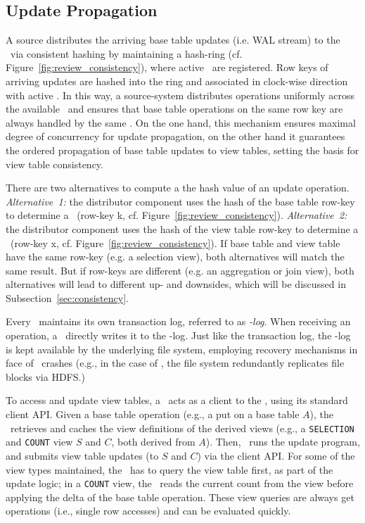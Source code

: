 \subsection{Update Propagation} 
\label{subsec:update_processing} 

A source distributes the arriving base table updates (i.e. WAL stream) 
to the \VMs\ via consistent hashing by maintaining a hash-ring
(cf. Figure~\ref{fig:review_consistency}), where active \VMs\ are
registered.  Row keys of arriving updates are hashed into the ring and
associated in clock-wise direction with active \VMs.  In this way, a
source-system distributes operations uniformly across the available
\VMs\ and ensures that base table operations on the same row key are
always handled by the same \VM. On the one hand, this mechanism
ensures maximal degree of concurrency for update propagation, on the other
hand it guarantees the ordered propagation of base table
updates to view tables, setting the basis for view table consistency.

There are two alternatives to compute a the hash value of an update 
operation. \textit{Alternative~1:} the distributor component uses the 
hash of the base table row-key to determine a \VM\ (row-key k, cf. 
Figure~\ref{fig:review_consistency}). \textit{Alternative~2:} the 
distributor component uses the hash of the view table row-key to 
determine a \VM\ (row-key x, cf. Figure~\ref{fig:review_consistency}). 
If base table and view table have the same row-key (e.g. a selection 
view), both alternatives will match the same result. But if row-keys are 
different (e.g. an aggregation or join view), both alternatives will 
lead to different up- and downsides, which will be discussed in 
Subsection~\ref{sec:consistency}. 


Every \VM\ maintains its own transaction log, referred to as
\textit{\VM-log}. When receiving an operation, a \VM\ directly writes
it to the \VM-log. Just like the transaction log, the \VM-log is kept
available by the underlying file system, employing recovery mechanisms
in face of \VM\ crashes (e.g., in the case of \HB, the file system
redundantly replicates file blocks via HDFS.)

To access and update view tables, a \VM\ acts as a client to the \KVS,
using its standard client API. Given a base table operation (e.g., a
put on a base table $A$), the \VM\ retrieves and caches the view
definitions of the derived views (e.g., a \texttt{SELECTION} and
\texttt{COUNT} view $S$ and $C$, both derived from $A$). Then,
\VM\ runs the update program, and submits view table updates (to $S$
and $C$) via the client API. For some of the view types maintained,
the \VM\ has to query the view table first, as part of the update
logic; in a \texttt{COUNT} view, the \VM\ reads the current count from
the view before applying the delta of the base table operation. These
view queries are always get operations (i.e., single row accesses) and
can be evaluated quickly.



